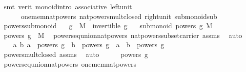 \begin{isabellebody}
\ {\isacharparenleft}{\kern0pt}smt\ {\isacharparenleft}{\kern0pt}verit{\isacharparenright}{\kern0pt}\ monoid{\isachardot}{\kern0pt}intro\ associative\ left{\isacharunderscore}{\kern0pt}unit\ \isanewline
\ \ \ \ \ \ one{\isacharunderscore}{\kern0pt}mem{\isacharunderscore}{\kern0pt}nat{\isacharunderscore}{\kern0pt}powers\ nat{\isacharunderscore}{\kern0pt}powers{\isacharunderscore}{\kern0pt}mult{\isacharunderscore}{\kern0pt}closed\ right{\isacharunderscore}{\kern0pt}unit\ submonoid{\isachardot}{\kern0pt}sub{\isacharparenright}{\kern0pt}%
\endisatagproof
{\isafoldproof}%
%
\isadelimproof
\isanewline
%
\endisadelimproof
\isanewline
{}\isamarkupfalse%
\ powers{\isacharunderscore}{\kern0pt}submonoid{\isacharcolon}{\kern0pt}\isanewline
\ \ \ {\isachardoublequoteopen}g\ {\isasymin}\ M{\isachardoublequoteclose}\ \ {\isachardoublequoteopen}invertible\ g{\isachardoublequoteclose}\isanewline
\ \ \ {\isachardoublequoteopen}submonoid\ {\isacharparenleft}{\kern0pt}powers\ g{\isacharparenright}{\kern0pt}\ M\ {\isacharparenleft}{\kern0pt}{\isasymcdot}{\isacharparenright}{\kern0pt}\ {\isasymone}{\isachardoublequoteclose}\isanewline
%
\isadelimproof
%
\endisadelimproof
%
\isatagproof
{}\isamarkupfalse%
\isanewline
\ \ \isamarkupfalse%
\ {\isachardoublequoteopen}powers\ g\ {\isasymsubseteq}\ M{\isachardoublequoteclose}\ \isamarkupfalse%
\ powers{\isacharunderscore}{\kern0pt}eq{\isacharunderscore}{\kern0pt}union{\isacharunderscore}{\kern0pt}nat{\isacharunderscore}{\kern0pt}powers\ nat{\isacharunderscore}{\kern0pt}powers{\isacharunderscore}{\kern0pt}subset{\isacharunderscore}{\kern0pt}carrier\ assms\ \isamarkupfalse%
\ auto\isanewline
{}\isamarkupfalse%
\isanewline
\ \ \isamarkupfalse%
\ {\isachardoublequoteopen}{\isasymAnd}a\ b{\isachardot}{\kern0pt}\ a\ {\isasymin}\ powers\ g\ {\isasymLongrightarrow}\ b\ {\isasymin}\ powers\ g\ {\isasymLongrightarrow}\ a\ {\isasymcdot}\ b\ {\isasymin}\ powers\ g{\isachardoublequoteclose}\ \isanewline
\ \ \ \ \isamarkupfalse%
\ powers{\isacharunderscore}{\kern0pt}mult{\isacharunderscore}{\kern0pt}closed\ assms\ \isamarkupfalse%
\ auto\isanewline
{}\isamarkupfalse%
\isanewline
\ \ \isamarkupfalse%
\ {\isachardoublequoteopen}{\isasymone}\ {\isasymin}\ powers\ g{\isachardoublequoteclose}\ \isamarkupfalse%
\ powers{\isacharunderscore}{\kern0pt}eq{\isacharunderscore}{\kern0pt}union{\isacharunderscore}{\kern0pt}nat{\isacharunderscore}{\kern0pt}powers\ one{\isacharunderscore}{\kern0pt}mem{\isacharunderscore}{\kern0pt}nat{\isacharunderscore}{\kern0pt}powers\ \isamarkupfalse%

\end{isabellebody}
